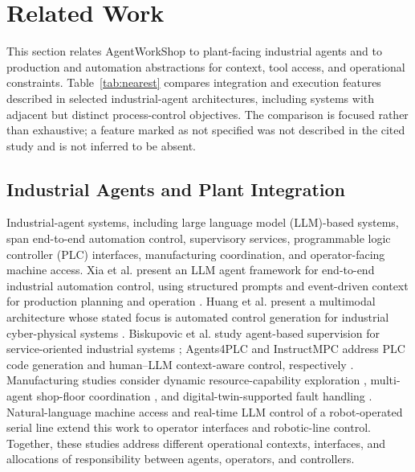 \section{Related Work}
\label{sec:related}
This section relates AgentWorkShop to plant-facing industrial agents and to
production and automation abstractions for context, tool access, and
operational constraints. Table~\ref{tab:nearest} compares integration and
execution features described in selected industrial-agent architectures,
including systems with adjacent but distinct process-control objectives. The
comparison is focused rather than exhaustive; a feature marked as not
specified was not described in the cited study and is not inferred to be
absent.

\subsection{Industrial Agents and Plant Integration}
Industrial-agent systems, including large language model (LLM)-based systems,
span end-to-end automation control, supervisory
services, programmable logic controller (PLC) interfaces, manufacturing
coordination, and operator-facing machine access. Xia et al. present an
LLM agent framework for end-to-end industrial automation control, using
structured prompts and event-driven context for production planning and
operation \cite{xia2025control}. Huang et al. present a multimodal
architecture whose stated focus is automated control generation for
industrial cyber-physical systems \cite{huang2026made}. Biskupovic et al.
study agent-based supervision for service-oriented industrial systems
\cite{biskupovic2025supervision};
Agents4PLC and InstructMPC address PLC code generation and human--LLM
context-aware control, respectively
\cite{liu2026agents4plc,wu2025instructmpc}. Manufacturing studies consider
dynamic resource-capability exploration \cite{lim2025llmenabled}, multi-agent
shop-floor coordination \cite{zhao2026shopfloor}, and digital-twin-supported
fault handling \cite{gill2025llmdt}. Natural-language machine access
\cite{hofmann2025nlc} and real-time LLM control of a robot-operated serial
line \cite{waseem2026pretrained} extend this work to operator interfaces and
robotic-line control. Together, these studies address different operational
contexts, interfaces, and allocations of responsibility between agents,
operators, and controllers.

